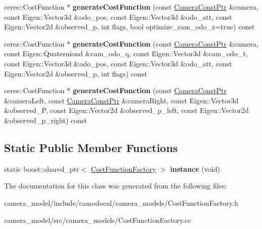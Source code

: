\begin{DoxyCompactItemize}
\item 
\mbox{\label{classcamodocal_1_1CostFunctionFactory_a6fb6f746cc6dfafe614a334c8858e0a8}} 
ceres\+::\+Cost\+Function $\ast$ {\bfseries generate\+Cost\+Function} (const \hyperlink{Camera_8h_a03fe5d6885a007cb4ad26d11f6198586}{Camera\+Const\+Ptr} \&camera, const Eigen\+::\+Vector3d \&odo\+\_\+pos, const Eigen\+::\+Vector3d \&odo\+\_\+att, const Eigen\+::\+Vector2d \&observed\+\_\+p, int flags, bool optimize\+\_\+cam\+\_\+odo\+\_\+z=true) const
\item 
\mbox{\label{classcamodocal_1_1CostFunctionFactory_adbbd63cb458cf51847df25591d898705}} 
ceres\+::\+Cost\+Function $\ast$ {\bfseries generate\+Cost\+Function} (const \hyperlink{Camera_8h_a03fe5d6885a007cb4ad26d11f6198586}{Camera\+Const\+Ptr} \&camera, const Eigen\+::\+Quaterniond \&cam\+\_\+odo\+\_\+q, const Eigen\+::\+Vector3d \&cam\+\_\+odo\+\_\+t, const Eigen\+::\+Vector3d \&odo\+\_\+pos, const Eigen\+::\+Vector3d \&odo\+\_\+att, const Eigen\+::\+Vector2d \&observed\+\_\+p, int flags) const
\item 
\mbox{\label{classcamodocal_1_1CostFunctionFactory_ad9db356b5c933326629dc9b3383d75da}} 
ceres\+::\+Cost\+Function $\ast$ {\bfseries generate\+Cost\+Function} (const \hyperlink{Camera_8h_a03fe5d6885a007cb4ad26d11f6198586}{Camera\+Const\+Ptr} \&camera\+Left, const \hyperlink{Camera_8h_a03fe5d6885a007cb4ad26d11f6198586}{Camera\+Const\+Ptr} \&camera\+Right, const Eigen\+::\+Vector3d \&observed\+\_\+P, const Eigen\+::\+Vector2d \&observed\+\_\+p\+\_\+left, const Eigen\+::\+Vector2d \&observed\+\_\+p\+\_\+right) const
\end{DoxyCompactItemize}
\subsection*{Static Public Member Functions}
\begin{DoxyCompactItemize}
\item 
\mbox{\label{classcamodocal_1_1CostFunctionFactory_aad2a8835aa630202ffe2ca9f796385f6}} 
static boost\+::shared\+\_\+ptr$<$ \hyperlink{classcamodocal_1_1CostFunctionFactory}{Cost\+Function\+Factory} $>$ {\bfseries instance} (void)
\end{DoxyCompactItemize}


The documentation for this class was generated from the following files\+:\begin{DoxyCompactItemize}
\item 
camera\+\_\+model/include/camodocal/camera\+\_\+models/Cost\+Function\+Factory.\+h\item 
camera\+\_\+model/src/camera\+\_\+models/Cost\+Function\+Factory.\+cc\end{DoxyCompactItemize}
